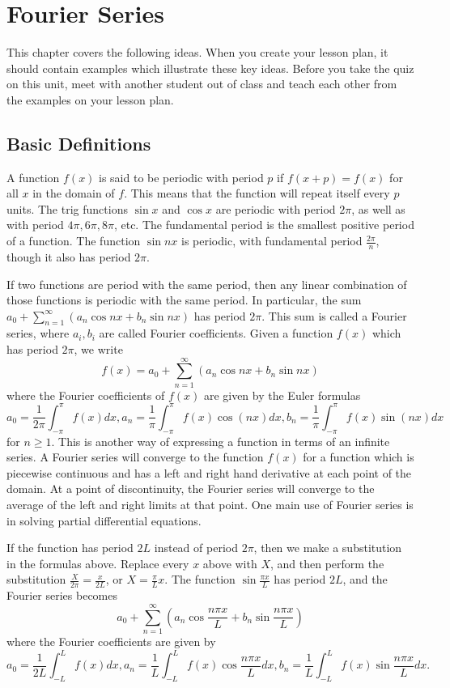 
\chapter{Fourier Series}

This chapter covers the following ideas. When you create your lesson plan, it should contain examples which illustrate these key ideas. Before you take the quiz on this unit, meet with another student out of class and teach each other from the examples on your lesson plan. 




\section{Basic Definitions}
A function $f(x)$ is said to be periodic with period $p$ if $f(x+p)=f(x)$ for all $x$ in the domain of $f$. This means that the function will repeat itself every $p$ units. The trig functions $\sin x$ and $\cos x$ are periodic with period $2\pi$, as well as with period $4\pi, 6\pi,8\pi$, etc. The fundamental period is the smallest positive period of a function. The function $\sin nx$ is periodic, with fundamental period $\frac{2\pi}{n}$, though it also has period $2\pi$.  

If two functions are period with the same period, then any linear combination of those functions is periodic with the same period. In particular, the sum $a_0 + \sum_{n=1}^\infty (a_n\cos nx +b_n\sin nx)$ has period $2\pi$.  This sum is called a Fourier series, where $a_i,b_i$ are called Fourier coefficients.  Given a function $f(x)$ which has period $2\pi$, we write $$f(x) = a_0 + \sum_{n=1}^\infty (a_n\cos nx +b_n\sin nx)$$ where the Fourier coefficients of $f(x)$ are given by the Euler formulas $$a_0 = \frac{1}{2\pi}\int_{-\pi}^\pi f(x)dx, a_n =  \frac{1}{\pi}\int_{-\pi}^\pi f(x)\cos (nx) dx,b_n =  \frac{1}{\pi}\int_{-\pi}^\pi f(x)\sin (nx) dx$$ for $n\geq 1$. This is another way of expressing a function in terms of an infinite series. 
A Fourier series will converge to the function $f(x)$ for a function which is piecewise continuous and has a left and right hand derivative at each point of the domain. At a point of discontinuity, the Fourier series will converge to the average of the left and right limits at that point. One main use of Fourier series is in solving partial differential equations.

If the function has period $2L$ instead of period $2\pi$, then we make a substitution in the formulas above. Replace every $x$ above with $X$, and then perform the substitution $\frac{X}{2\pi}=\frac{x}{2L}$, or $X=\frac{\pi}{L}x$. The function $\sin\frac{\pi x}{L}$ has period $2L$, and the Fourier series becomes $$a_0 + \sum_{n=1}^\infty \left(a_n\cos \frac{n\pi x}{L} +b_n\sin \frac{n\pi x}{L}\right)$$ where the Fourier coefficients are given by $$a_0 = \frac{1}{2L}\int_{-L}^L f(x)dx, a_n =  \frac{1}{L}\int_{-L}^L f(x)\cos  \frac{n\pi x}{L} dx,b_n =  \frac{1}{L}\int_{-L}^L f(x)\sin  \frac{n\pi x}{L} dx.$$

